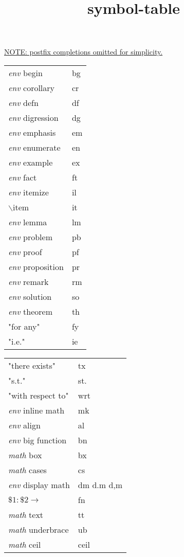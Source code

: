 \documentclass[10pt]{beamer}
\title{symbol-table}
\begin{document}
\begin{frame}
\underline{NOTE: postfix completions omitted for simplicity.}


\begin{tabular}{ll}
\textit{env} begin & bg \\
\textit{env} corollary & cr \\
\textit{env} defn & df \\
\textit{env} digression & dg \\
\textit{env} emphasis & em \\
\textit{env} enumerate & en \\
\textit{env} example & ex \\
\textit{env} fact & ft \\
\textit{env} itemize & il \\
$\backslash$item & it \\
\textit{env} lemma & lm \\
\textit{env} problem & pb \\
\textit{env} proof & pf \\
\textit{env} proposition & pr \\
\textit{env} remark & rm \\
\textit{env} solution & so \\
\textit{env} theorem & th \\
"for any" & fy \\
"i.e." & ie \\
\end{tabular}
\hspace*{1ex}
\vrule
\begin{tabular}{ll}
"there exists" & tx \\
"s.t." & st. \\
"with respect to" & wrt \\
\textit{env} inline math & mk \\
\textit{env} align & al \\
\textit{env} big function & bn \\
\textit{math} box & bx \\
\textit{math} cases & cs \\
\textit{env} display math & dm d.m d,m \\
$\text{\$1}\colon \text{\$2} \to$ & fn \\
\textit{math} text & tt \\
\textit{math} underbrace & ub \\
\textit{math} ceil & ceil \\

\end{tabular}
\end{frame}
\end{document}
